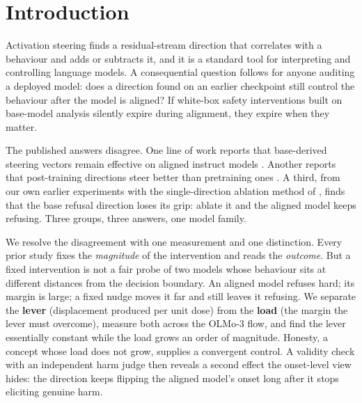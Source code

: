 \documentclass[11pt]{article}
\begin{document}
\section{Introduction}
Activation steering finds a residual-stream direction that correlates with a behaviour and adds or
subtracts it, and it is a standard tool for interpreting and controlling language models. A
consequential question follows for anyone auditing a deployed model: does a direction found on an
earlier checkpoint still control the behaviour after the model is aligned? If white-box safety
interventions built on base-model analysis silently expire during alignment, they expire when they
matter.

The published answers disagree. One line of work reports that base-derived steering vectors remain
effective on aligned instruct models \citep{personavectors}. Another reports that post-training
directions steer better than pretraining ones \citep{olmoharmfulness}. A third, from our own
earlier experiments with the single-direction ablation method of \citet{arditi}, finds that the
base refusal direction loses its grip: ablate it and the aligned model keeps refusing. Three
groups, three answers, one model family.

We resolve the disagreement with one measurement and one distinction. Every prior study fixes the
\emph{magnitude} of the intervention and reads the \emph{outcome}. But a fixed intervention is not a
fair probe of two models whose behaviour sits at different distances from the decision boundary. An
aligned model refuses hard; its margin is large; a fixed nudge moves it far and still leaves it
refusing. We separate the \textbf{lever} (displacement produced per unit dose) from the
\textbf{load} (the margin the lever must overcome), measure both across the OLMo-3 flow, and find
the lever essentially constant while the load grows an order of magnitude. Honesty, a concept whose
load does not grow, supplies a convergent control. A validity check with an independent harm judge
then reveals a second effect the onset-level view hides: the direction keeps flipping the aligned
model's onset long after it stops eliciting genuine harm.
\end{document}
